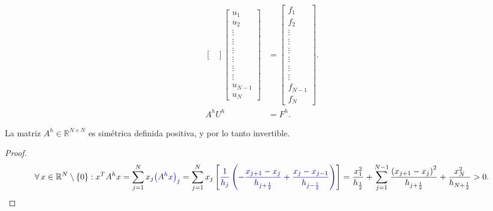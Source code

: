 \begin{frame}
\begin{align*}
\begin{bmatrix}
		\end{bmatrix}
		\begin{bmatrix}
			u_{1}   \\
			u_{2}   \\
			\vdots  \\
			\vdots  \\
			\vdots  \\
			\vdots  \\
			\vdots  \\
			\vdots  \\
			u_{N-1} \\
			u_{N}
		\end{bmatrix} & =
		\begin{bmatrix}
			f_{1}   \\
			f_{2}   \\
			\vdots  \\
			\vdots  \\
			\vdots  \\
			\vdots  \\
			\vdots  \\
			\vdots  \\
			f_{N-1} \\
			f_{N}
		\end{bmatrix}.      \\
		A^{h}U^{h}      & =
		F^{h}.
	\end{align*}

	\pause

	\begin{theorem}
		La matriz $A^{h}\in\mathbb{R}^{N\times N}$ es simétrica definida
		positiva, y por lo tanto invertible.
	\end{theorem}

	\pause

	\begin{proof}
		\begin{equation*}
			\forall x\in\mathbb{R}^{N}\setminus\left\{0\right\}:
			x^{T}A^{h}x=
			\sum_{j=1}^{N}
			x_{j}
			\mathcolor{DarkBlue}{
				{\big(A^{h}x\big)}_{j}
			}=
			\sum_{j=1}^{N}
			x_{j}
			\mathcolor{DarkBlue}{
				\left[
					\frac{1}{h_{j}}
					\left(
					-\frac{x_{j+1}-x_{j}}{h_{j+\frac{1}{2}}}+
					\frac{x_{j}-x_{j-1}}{h_{j-\frac{1}{2}}}
					\right)
					\right]
			}=
			\frac{x^{2}_{1}}{h_{\frac{1}{2}}}+
			\sum_{j=1}^{N-1}
			\frac{{\left(x_{j+1}-x_{j}\right)}^{2}}{h_{j+\frac{1}{2}}}+
			\frac{x^{2}_{N}}{h_{N+\frac{1}{2}}}
			>0.
		\end{equation*}
	\end{proof}
\end{frame}

